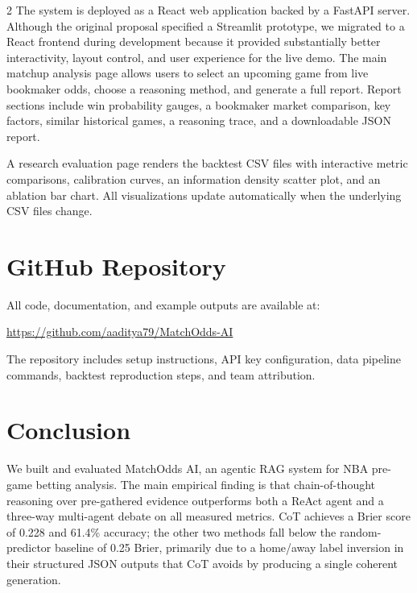 \documentclass[11pt]{article}
\begin{document}
\begin{multicols}{2}
The system is deployed as a React web application backed by a FastAPI server. Although the original proposal specified a Streamlit prototype, we migrated to a React frontend during development because it provided substantially better interactivity, layout control, and user experience for the live demo. The main matchup analysis page allows users to select an upcoming game from live bookmaker odds, choose a reasoning method, and generate a full report. Report sections include win probability gauges, a bookmaker market comparison, key factors, similar historical games, a reasoning trace, and a downloadable JSON report.

A research evaluation page renders the backtest CSV files with interactive metric comparisons, calibration curves, an information density scatter plot, and an ablation bar chart. All visualizations update automatically when the underlying CSV files change.

\section{GitHub Repository}

All code, documentation, and example outputs are available at:

\begin{center}
\url{https://github.com/aaditya79/MatchOdds-AI}
\end{center}

The repository includes setup instructions, API key configuration, data pipeline commands, backtest reproduction steps, and team attribution.

\section{Conclusion}

We built and evaluated MatchOdds AI, an agentic RAG system for NBA pre-game betting analysis. The main empirical finding is that chain-of-thought reasoning over pre-gathered evidence outperforms both a ReAct agent and a three-way multi-agent debate on all measured metrics. CoT achieves a Brier score of 0.228 and 61.4\% accuracy; the other two methods fall below the random-predictor baseline of 0.25 Brier, primarily due to a home/away label inversion in their structured JSON outputs that CoT avoids by producing a single coherent generation.


\end{multicols}
\end{document}
